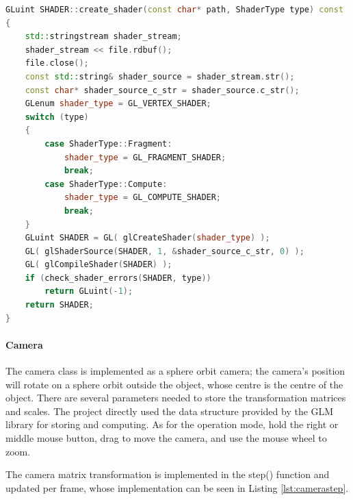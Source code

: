 \hspace*{\fill}
\hspace*{\fill}

\begin{lstlisting}[language=C++, label={lst:shadercreate}, caption = Function of creating shader]
GLuint SHADER::create_shader(const char* path, ShaderType type) const
{
    std::stringstream shader_stream;
    shader_stream << file.rdbuf();
    file.close();
    const std::string& shader_source = shader_stream.str();
    const char* shader_source_c_str = shader_source.c_str();
    GLenum shader_type = GL_VERTEX_SHADER;
    switch (type)
    {
        case ShaderType::Fragment:
            shader_type = GL_FRAGMENT_SHADER;
            break;
        case ShaderType::Compute:
            shader_type = GL_COMPUTE_SHADER;
            break;
    }
    GLuint SHADER = GL( glCreateShader(shader_type) );
    GL( glShaderSource(SHADER, 1, &shader_source_c_str, 0) );
    GL( glCompileShader(SHADER) );
    if (check_shader_errors(SHADER, type)) 
        return GLuint(-1);
    return SHADER;
}
\end{lstlisting}

\paragraph{Camera}

The camera class is implemented as a sphere orbit camera; the camera's position will rotate on a sphere orbit outside the object, whose centre is the centre of the object. There are several parameters needed to store the transformation matrices and scales. The project directly used the data structure provided by the GLM library for storing and computing. As for the operation mode, hold the right or middle mouse button, drag to move the camera, and use the mouse wheel to zoom. 

\hspace*{\fill}

The camera matrix transformation is implemented in the step() function and updated per frame, whose implementation can be seen in Listing \ref{lst:camerastep}.

\clearpage

